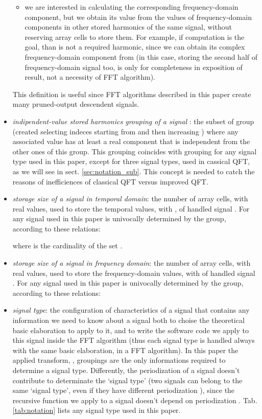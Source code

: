 \documentclass[a4paper,10pt]{article}
\begin{document}
\begin{itemize}
\begin{itemize}
\item
we are interested in calculating the corresponding frequency-domain component, but we obtain its value from the values of frequency-domain components in other stored harmonics of the same signal, without reserving array cells to store them.
For example, if  computation is the goal, than  is not a required harmonic, since we can obtain its complex frequency-domain component  from 
(in this case, storing the second half of  frequency-domain signal too, is only for completeness in exposition of result, not a necessity of FFT algorithm).

\end{itemize}
This definition is useful since FFT algorithms described in this paper create many pruned-output descendent signals.



\item
\emph{indipendent-value stored harmonics grouping  of a signal }:
the subset of  group (created selecting  indeces starting from  and then increasing ) where any associated  value has at least a real component that is independent from the other ones of this group.
This grouping coincides with  grouping for any signal type used in this paper, except for three signal types, used in cassical QFT, as we will see in sect. \ref{sec:notation_sub}.
This concept is needed to catch the reasons of inefficiences of classical QFT versus improved QFT.



\item
\emph{storage size  of a signal  in temporal domain}: 
the number of array cells, with real values, used to store the temporal  values, with , of handled signal .
For any signal used in this paper  is univocally determined by the  group, according to these relations:

where  is the cardinality of the set .


\item
\emph{storage size  of a signal  in frequency domain}: 
the number of array cells, with real values, used to store the frequency-domain  values, with  of handled signal .
For any signal used in this paper  is univocally determined by the  group, according to these relations:




\item
\emph{signal type}: the configuration of characteristics of a signal that contains any information we need to know about a signal both to choise the theoretical basic elaboration to apply to it, and to write the software code we apply to this signal inside the FFT algorithm (thus each signal type is handled always with the same basic elaboration, in a FFT algorithm).
In this paper the applied transform, ,  groupings are the only informations required to determine a signal type.
Differently, the periodization  of a signal doesn't contribute to determinate the `signal type' (two signals can belong to the same `signal type', even if they have different periodization ), since the recursive function we apply to a signal doesn't depend on periodization .
Tab.\ref{tab:notation} lists any signal type used in this paper.




\end{itemize}
\end{document}
